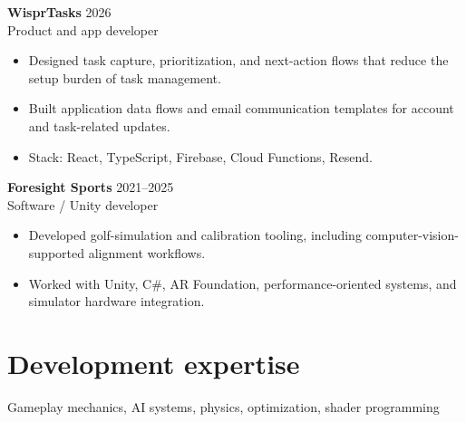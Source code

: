 \documentclass[10pt,letterpaper]{article}
\begin{document}
\textbf{WisprTasks} \hfill 2026\\
Product and app developer\\[-5pt]
\begin{itemize}
  \item Designed task capture, prioritization, and next-action flows that reduce the setup burden of task management.
  \item Built application data flows and email communication templates for account and task-related updates.
  \item Stack: React, TypeScript, Firebase, Cloud Functions, Resend.
\end{itemize}

\textbf{Foresight Sports} \hfill 2021--2025\\
Software / Unity developer\\[-5pt]
\begin{itemize}
  \item Developed golf-simulation and calibration tooling, including computer-vision-supported alignment workflows.
  \item Worked with Unity, C\#, AR Foundation, performance-oriented systems, and simulator hardware integration.
\end{itemize}

\section*{Development expertise}
Gameplay mechanics, AI systems, physics, optimization, shader programming
\end{document}

